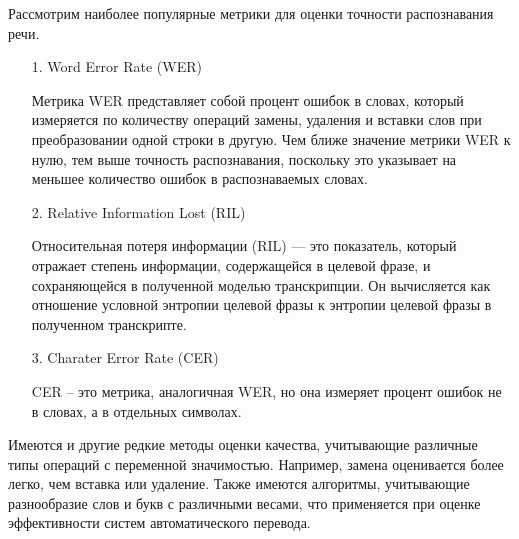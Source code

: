 Рассмотрим наиболее популярные метрики для оценки точности распознавания речи.

\begin{itemize}[parsep=0.4em]
    \setlength\itemsep{0.8em plus 0.2em minus 0.2em}
    \item[1.] Word Error Rate (WER)

        Метрика WER представляет собой процент ошибок в словах, который измеряется по количеству операций замены, удаления и вставки слов при преобразовании одной строки в другую. Чем ближе значение метрики WER к нулю, тем выше точность распознавания, поскольку это указывает на меньшее количество ошибок в распознаваемых словах.

    \item[2.] Relative Information Lost (RIL)
    
    Относительная потеря информации (RIL) — это показатель, который отражает степень информации, содержащейся в целевой фразе, и сохраняющейся в полученной моделью транскрипции. Он вычисляется как отношение условной энтропии целевой фразы к энтропии целевой фразы в полученном транскрипте.

    \item[3.] Charater Error Rate (CER)

    CER – это метрика, аналогичная WER, но она измеряет процент ошибок не в словах, а в отдельных символах.
\end{itemize}

Имеются и другие редкие методы оценки качества, учитывающие различные типы операций с переменной значимостью. Например, замена оценивается более легко, чем вставка или удаление. Также имеются алгоритмы, учитывающие разнообразие слов и букв с различными весами, что применяется при оценке эффективности систем автоматического перевода.
